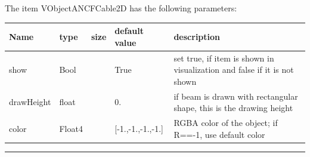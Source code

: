The item VObjectANCFCable2D has the following parameters:\vspace{-1cm}\\ 
\begin{center}
  \footnotesize
  \begin{longtable}{| p{4.5cm} | p{2.5cm} | p{0.5cm} | p{2.5cm} | p{6cm} |}
    \hline
    \bf Name & \bf type & \bf size & \bf default value & \bf description \\ \hline
    show &     Bool &      &     True &     set true, if item is shown in visualization and false if it is not shown\\ \hline
    drawHeight &     float &      &     0. &     if beam is drawn with rectangular shape, this is the drawing height\\ \hline
    color &     Float4 &      &     [-1.,-1.,-1.,-1.] &     RGBA color of the object; if R==-1, use default color\\ \hline
	  \end{longtable}
	\end{center}
\par\noindent\rule{\textwidth}{0.4pt}
\label{description_ObjectANCFCable2D}
